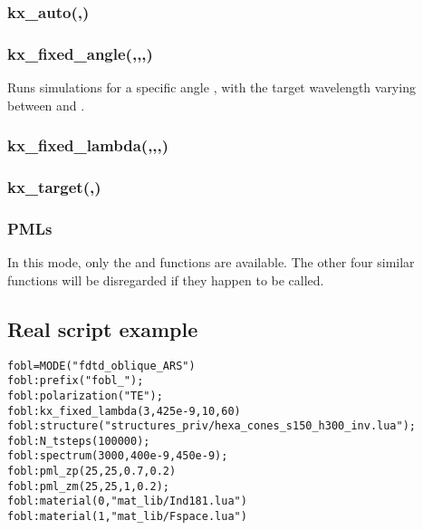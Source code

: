 \subsubsection[kx\_auto]{kx\_auto(,)}

\subsubsection[kx\_fixed\_angle]{kx\_fixed\_angle(,,,)}

Runs  simulations for a specific angle , with the target wavelength varying between  and .

\subsubsection[kx\_fixed\_lambda]{kx\_fixed\_lambda(,,,)}

\fwarn

\subsubsection[kx\_target]{kx\_target(,)}

	\fwarn

\subsubsection{PMLs}

In this mode, only the  and  functions are available. The other four similar functions will be disregarded if they happen to be called.

\subsection{Real script example}

\begin{lstlisting}
fobl=MODE("fdtd_oblique_ARS")
fobl:prefix("fobl_");
fobl:polarization("TE");
fobl:kx_fixed_lambda(3,425e-9,10,60)
fobl:structure("structures_priv/hexa_cones_s150_h300_inv.lua");
fobl:N_tsteps(100000);
fobl:spectrum(3000,400e-9,450e-9);
fobl:pml_zp(25,25,0.7,0.2)
fobl:pml_zm(25,25,1,0.2);
fobl:material(0,"mat_lib/Ind181.lua")
fobl:material(1,"mat_lib/Fspace.lua")
\end{lstlisting}

